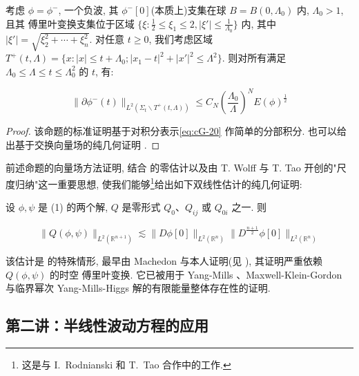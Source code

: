 \begin{proposition}\label{prop:cG-1.27}
考虑 $\phi = \phi^{-}$, 一个负波, 其 $\phi^{-}[0]$(本质上)支集在球 $B = B(0,  \Lambda_0)$ 内, $\Lambda_0 > 1$, 且其 傅里叶变换支集位于区域 $\{\xi : \frac{1}{2} \leq \xi_1 \leq 2,  |\xi'| \leq \frac{1}{\Lambda_0} \}$ 内, 其中 $|\xi'| = \sqrt{\xi_2^2 + \cdots + \xi_n^2}$. 对任意 $t \geq 0$, 我们考虑区域 $T^{+}(t,  \Lambda) = \{x : |x| \leq t + \Lambda_0;  |x_1 - t|^2 + |x'|^2 \leq \Lambda^2\}$. 则对所有满足 $\Lambda_0 \leq \Lambda \leq t \leq \Lambda_0^2$ 的 $t$, 有:

\[
\| \partial \phi^ {-} (t) \| _ {L ^ {2} (\Sigma_ {t} \backslash T ^ {+} (t,  \Lambda))} \leq C _ {N} \left(\frac {\Lambda_ {0}}{\Lambda} \right) ^ {N} E (\phi) ^ {\frac {1}{2}}
\]
\end{proposition}

\begin{proof}
该命题的标准证明基于对积分表示\eqref{eq:cG-20} 作简单的分部积分. 也可以给出基于交换向量场的纯几何证明 \cite{gfref43}. 
\end{proof}

前述命题的向量场方法证明, 结合 的零估计以及由 T. Wolff \cite{gfref76} 与 T. Tao \cite{gfref68} 开创的"尺度归纳"这一重要思想, 使我们能够\footnote{这是与 I.~Rodnianski 和 T.~Tao 合作中的工作.}给出如下双线性估计的纯几何证明:

\begin{proposition}\label{prop:cG-1.28}
设 $\phi,  \psi$ 是 (1) 的两个解, $Q$ 是零形式 $Q_0$、$Q_{ij}$ 或 $Q_{0i}$ 之一. 则

\begin{equation}
\| Q (\phi ,  \psi) \| _ {L ^ {2} (\mathbb {R} ^ {n + 1})} \lesssim \| D \phi [ 0 ] \| _ {L ^ {2} (\mathbb {R} ^ {n})} \| D ^ {\frac {n + 1}{2}} \phi [ 0 ] \| _ {L ^ {2} (\mathbb {R} ^ {n})}\label{eq:cG-21}
\end{equation}

该估计是 的特殊情形, 最早由 Machedon 与本人证明(见 \cite{gfref31}), 其证明严重依赖 $Q(\phi,  \psi)$ 的时空 傅里叶变换. 它已被用于 Yang-Mills \cite{gfref34}、Maxwell-Klein-Gordon \cite{gfref33} 与临界幂次 Yang-Mills-Higgs \cite{gfref19} 解的有限能量整体存在性的证明. 
\end{proposition}

\subsection{第二讲：半线性波动方程的应用}

